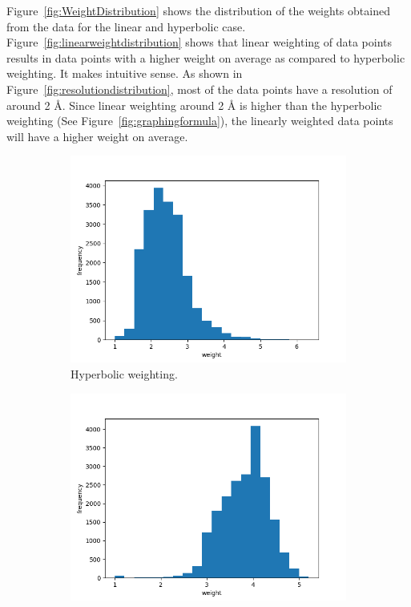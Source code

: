 \documentclass[11pt]{article}
\begin{document}
Figure~\ref{fig:WeightDistribution} shows the distribution of the weights obtained from the data for the linear and hyperbolic case.
Figure~\ref{fig:linearweightdistribution} shows that linear weighting of data points results in data points with a higher weight on average as compared to hyperbolic weighting.
It makes intuitive sense. As shown in Figure~\ref{fig:resolutiondistribution}, 
most of the data points have a resolution of around 2 \si{\angstrom}.
Since linear weighting around 2 \si{\angstrom} is higher than the hyperbolic weighting (See Figure~\ref{fig:graphingformula}), the linearly weighted data points will have a higher weight on average.

\begin{figure}
     \centering
     \begin{subfigure}[b]{0.45\textwidth}
         \centering
    \includegraphics[scale=0.5]{images/hyperbolicweightdistribution}
    \caption{Hyperbolic weighting.}
    \label{fig:hyperbolicweightdistribution}
     \end{subfigure}
     \hfill
     \begin{subfigure}[b]{0.45\textwidth}
         \centering
        \includegraphics[scale=0.5]{images/linearweightdistribution}

\end{subfigure}
\end{figure}
\end{document}
